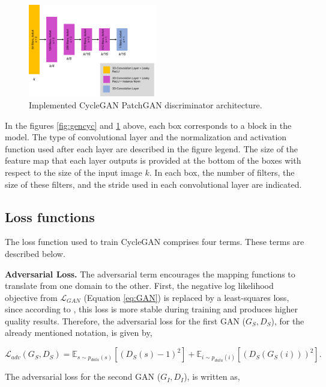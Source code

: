 \begin{figure}[!htb]
  \centering
  \includegraphics[width=0.50\textwidth]{Images/discriminator_cyclegan.jpg}
  \caption{Implemented CycleGAN PatchGAN discriminator architecture.}
  \label{fig:disccyc}
\end{figure}

In the figures \ref{fig:gencyc} and \ref{fig:disccyc} above, each box corresponds to a block in the model. The type of convolutional layer and the normalization and activation function used after each layer are described in the figure legend. The size of the feature map that each layer outputs is provided at the bottom of the boxes with respect to the size of the input image $k$. In each box, the number of filters, the size of these filters, and the stride used in each convolutional layer are indicated.

\subsection*{Loss functions}

The loss function used to train CycleGAN comprises four terms. These terms are described below.

\textbf{Adversarial Loss.} The adversarial term encourages the mapping functions to translate from one domain to
the other. First, the negative log likelihood objective from $\mathcal{L}_{GAN}$  (Equation \ref{eq:GAN}) is replaced by a least-squares loss, since according to \cite{cycleGAN:original}, this loss is more stable during training and produces higher quality results. Therefore, the adversarial loss for the first GAN ($G_{S}, D_S$), for the already mentioned notation, is given by,

\begin{equation}
    \mathcal{L}_{adv}(G_{S},D_S) = \mathbb{E}_{s \sim p_{data}(s)} [(D_S(s)-1)^2] + \mathbb{E}_{i \sim p_{data}(i)} [(D_S(G_{S}(i)))^2].
\end{equation}

The adversarial loss for the second GAN ($G_{I}, D_I$), is written as,

